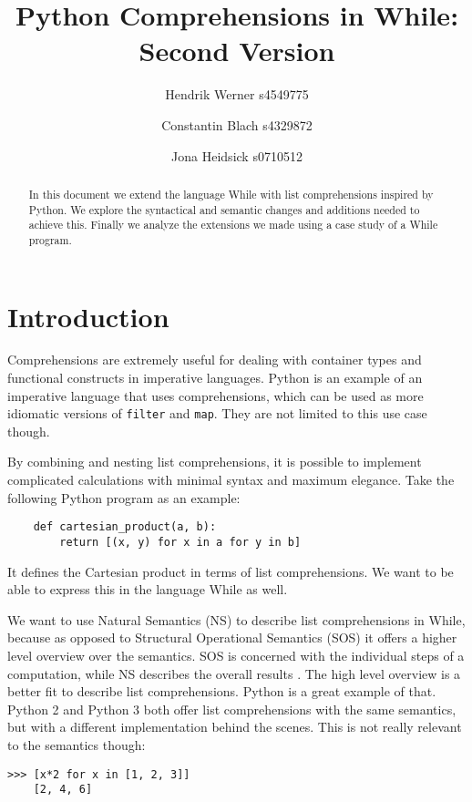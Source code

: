 \documentclass[12pt]{article}
\title{
    Python Comprehensions in While:\\
    Second Version
}
\author{
    Hendrik Werner s4549775
    \and Constantin Blach s4329872
    \and Jona Heidsick s0710512
}
\newcommand\mono\texttt
\begin{document}
\maketitle

\begin{abstract}
\noindent %
In this document we extend the language While with list comprehensions inspired by Python. We explore the syntactical and semantic changes and additions needed to achieve this. Finally we analyze the extensions we made using a case study of a While program.
\end{abstract}

\tableofcontents

\section{Introduction}
Comprehensions are extremely useful for dealing with container types and functional constructs in imperative languages. Python is an example of an imperative language that uses comprehensions, which can be used as more idiomatic versions of \mono{filter} and \mono{map}. They are not limited to this use case though.

By combining and nesting list comprehensions, it is possible to implement complicated calculations with minimal syntax and maximum elegance. Take the following Python program as an example:

\begin{lstlisting}
    def cartesian_product(a, b):
        return [(x, y) for x in a for y in b]
\end{lstlisting}

It defines the Cartesian product in terms of list comprehensions. We want to be able to express this in the language While as well.

We want to use Natural Semantics (NS) to describe list comprehensions in While, because as opposed to Structural Operational Semantics (SOS) it offers a higher level overview over the semantics. SOS is concerned with the individual steps of a computation, while NS describes the overall results \cite{wiley}. The high level overview is a better fit to describe list comprehensions. Python is a great example of that. Python 2 and Python 3 both offer list comprehensions with the same semantics, but with a different implementation behind the scenes. This is not really relevant to the semantics though:

\begin{lstlisting}[title=Python 2/3]
    >>> [x*2 for x in [1, 2, 3]]
    [2, 4, 6]
\end{lstlisting}
\end{document}
